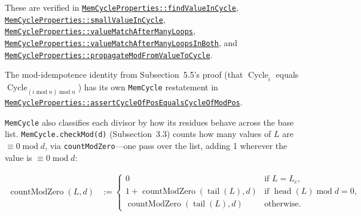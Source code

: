 {\raggedright
These are verified in
\href{https://github.com/thiagomata/prime-numbers/blob/cycle-article-v1.0.0/src/main/scala/v1/chapter4/cycle/memory/properties/MemCycleProperties.scala}{\texttt{MemCycleProperties::findValueInCycle}},
\href{https://github.com/thiagomata/prime-numbers/blob/cycle-article-v1.0.0/src/main/scala/v1/chapter4/cycle/memory/properties/MemCycleProperties.scala}{\texttt{MemCycleProperties::smallValueInCycle}},
\href{https://github.com/thiagomata/prime-numbers/blob/cycle-article-v1.0.0/src/main/scala/v1/chapter4/cycle/memory/properties/MemCycleProperties.scala}{\texttt{MemCycleProperties::valueMatchAfterManyLoops}},
\href{https://github.com/thiagomata/prime-numbers/blob/cycle-article-v1.0.0/src/main/scala/v1/chapter4/cycle/memory/properties/MemCycleProperties.scala}{\texttt{MemCycleProperties::valueMatchAfterManyLoopsInBoth}},
and
\href{https://github.com/thiagomata/prime-numbers/blob/cycle-article-v1.0.0/src/main/scala/v1/chapter4/cycle/memory/properties/MemCycleProperties.scala}{\texttt{MemCycleProperties::propagateModFromValueToCycle}}.

The mod-idempotence identity from Subsection~5.5's proof (that
$\operatorname{Cycle}_i$ equals
$\operatorname{Cycle}_{(i\operatorname{mod}n)\operatorname{mod}n}$) has its
own \texttt{MemCycle} restatement in
\href{https://github.com/thiagomata/prime-numbers/blob/cycle-article-v1.0.0/src/main/scala/v1/chapter4/cycle/memory/properties/MemCycleProperties.scala}{\texttt{MemCycleProperties::assertCycleOfPosEqualsCycleOfModPos}}.
\par}

{\raggedright
\texttt{MemCycle} also classifies each divisor by how its residues behave
across the base list. \texttt{MemCycle.checkMod(d)} (Subsection~3.3) counts how
many values of $L$ are $\equiv 0\operatorname{mod}d$, via
\texttt{countModZero}---one pass over the list, adding 1 wherever the value is
$\equiv 0\operatorname{mod}d$:
\par}

\begin{equation*}
\begin{aligned}
\operatorname{countModZero}(L,d)&:={}
\begin{cases}
0 & \text{if }L=L_e, \\
1+\operatorname{countModZero}(\operatorname{tail}(L),d)
  & \text{if }\operatorname{head}(L)\operatorname{mod}d=0, \\
\operatorname{countModZero}(\operatorname{tail}(L),d)
  & \text{otherwise}.
\end{cases}
\end{aligned}
\end{equation*}

